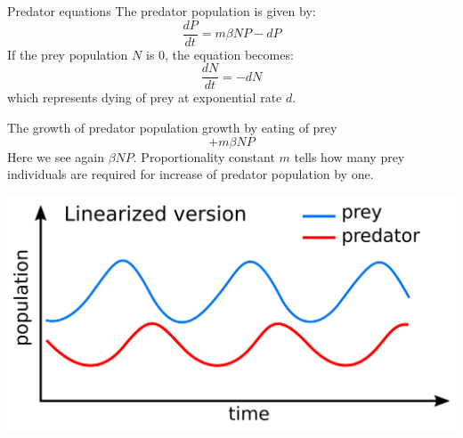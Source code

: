 \begin{frame}{Predator equations}
\footnotesize
    The predator population is given by:
      \begin{equation}
        \frac{dP}{dt} = m\beta NP - dP
    \end{equation}
    \pause
    If the prey population $N$ is 0, the equation becomes:
    \begin{equation}
        \frac{dN}{dt} = - dN 
    \end{equation}
    which represents dying of prey at exponential rate $d$.

\vfill
     \pause
    The growth of predator population growth by eating of prey
    \begin{equation}
        + m \beta NP
    \end{equation}
    Here we see again $\beta NP$. Proportionality constant $m$ tells how many prey individuals are required for increase of predator population by one. 
\end{frame}


\begin{frame}
\begin{center}
    \includegraphics[scale = 0.1]{lesson_2/images/predator_prey_in_time.png}
\end{center}
    
\end{frame}

